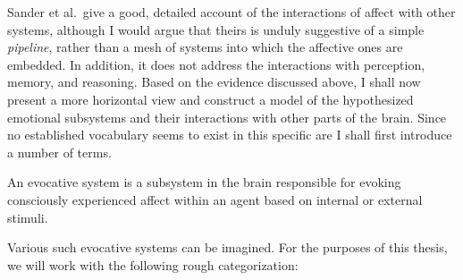 Sander et al.\ give a good, detailed account of the interactions of affect with other systems, although I would argue that theirs is unduly suggestive of a simple {\em pipeline}, rather than a mesh of systems into which the affective ones are embedded. In addition, it does not address the interactions with perception, memory, and reasoning. Based on the evidence discussed above, I shall now present a more horizontal view and construct a model of the hypothesized emotional subsystems and their interactions with other parts of the brain. Since no established vocabulary seems to exist in this specific are I shall first introduce a number of terms.

\begin{definition}
An evocative system is a subsystem in the brain responsible for evoking consciously experienced affect within an agent based on internal or external stimuli.
\end{definition} 

Various such evocative systems can be imagined. For the purposes of this thesis, we will work with the following rough categorization:

